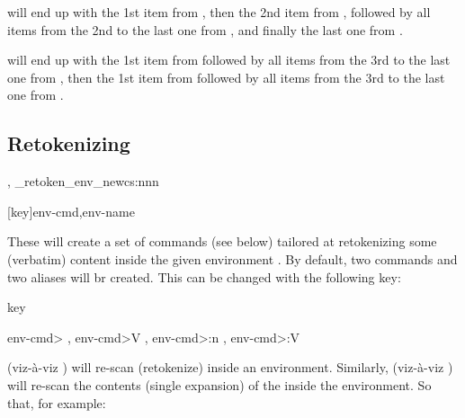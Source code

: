 \documentclass[10pt]{article}
\begin{document}

\tsobj{\tempA} will end up with the 1st item from , then the  2nd item from , followed by all items from the 2nd to the last one from , and finally the last one from .

\tsobj{\tempB} will end up with the 1st item from  followed by all items from the 3rd to the last one from  , then the 1st item from  followed by all items from the 3rd to the last one from  .


\subsection{Retokenizing}
\begin{codedescribe}{\cvRetokenEnvNewCommand , \codeverb_retoken_env_newcs:nnn }
\begin{codesyntax}%
\tsmacro{\cvRetokenEnvNewCommand}[key]{env-cmd,env-name}
\end{codesyntax}
These will create a set of commands (see below) tailored at retokenizing  some (verbatim) content inside the given   environment .
 By default, two  commands  and two \LaTeXe{} aliases will br created. This can be changed with the following key:

\begin{describelist*}{key}
\end{describelist*}
\end{codedescribe}

\begin{codedescribe}{ \<env-cmd> , \<env-cmd>V , \<env-cmd>:n , \<env-cmd>:V }
\begin{codesyntax}%
\end{codesyntax}
 (viz-à-viz ) will re-scan (retokenize)   inside an  environment. Similarly,  (viz-à-viz ) will re-scan the contents (single expansion) of the  inside the  environment. So that, for example:
\end{codedescribe}
\end{document}
